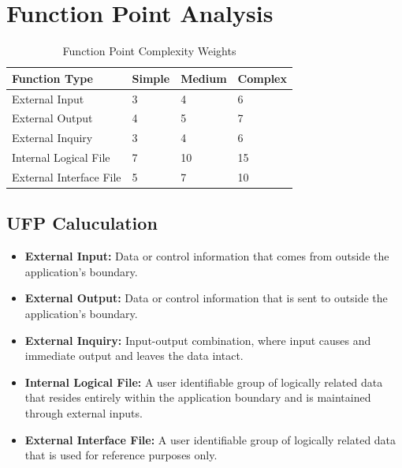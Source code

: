 \documentclass[11pt]{article}
\begin{document}
\section{Function Point Analysis}
\begin{table}[H]
    \centering
    \begin{tabular}{|p{3cm}|p{3cm}|p{3cm}|p{3cm}|}
        \hline
        \textbf{Function Type}  & \textbf{Simple} & \textbf{Medium} & \textbf{Complex} \\
        \hline
        External Input          & 3               & 4               & 6                \\
        \hline
        External Output         & 4               & 5               & 7                \\
        \hline
        External Inquiry        & 3               & 4               & 6                \\
        \hline
        Internal Logical File   & 7               & 10              & 15               \\
        \hline
        External Interface File & 5               & 7               & 10               \\
        \hline
    \end{tabular}
    \caption{Function Point Complexity Weights}
\end{table}

\subsection{UFP Caluculation}

\begin{itemize}
    \item \textbf{External Input:} Data or control information that comes from outside the application's boundary.
    \item \textbf{External Output:} Data or control information that is sent to outside the application's boundary.
    \item \textbf{External Inquiry:} Input-output combination, where input causes and immediate output and leaves the data intact.
    \item \textbf{Internal Logical File:} A user identifiable group of logically related data that resides entirely within the application boundary and is maintained through external inputs.
    \item \textbf{External Interface File:} A user identifiable group of logically related data that is used for reference purposes only.
\end{itemize}
\end{document}
